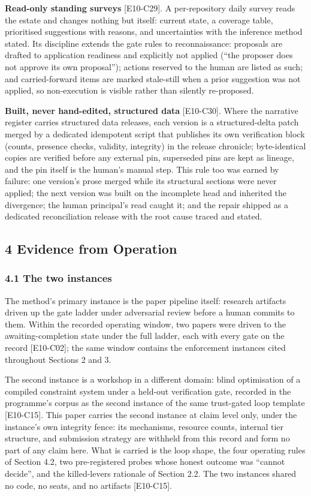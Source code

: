 \documentclass[
  11pt,
]{article}
\begin{document}
\textbf{Read-only standing surveys} {[}E10-C29{]}. A per-repository
daily survey reads the estate and changes nothing but itself: current
state, a coverage table, prioritised suggestions with reasons, and
uncertainties with the inference method stated. Its discipline extends
the gate rules to reconnaissance: proposals are drafted to application
readiness and explicitly not applied (``the proposer does not approve
its own proposal''); actions reserved to the human are listed as such;
and carried-forward items are marked stale-still when a prior suggestion
was not applied, so non-execution is visible rather than silently
re-proposed.

\textbf{Built, never hand-edited, structured data} {[}E10-C30{]}. Where
the narrative register carries structured data releases, each version is
a structured-delta patch merged by a dedicated idempotent script that
publishes its own verification block (counts, presence checks, validity,
integrity) in the release chronicle; byte-identical copies are verified
before any external pin, superseded pins are kept as lineage, and the
pin itself is the human's manual step. This rule too was earned by
failure: one version's prose merged while its structural sections were
never applied; the next version was built on the incomplete head and
inherited the divergence; the human principal's read caught it; and the
repair shipped as a dedicated reconciliation release with the root cause
traced and stated.

\subsection{4 Evidence from Operation}\label{evidence-from-operation}

\subsubsection{4.1 The two instances}\label{the-two-instances}

The method's primary instance is the paper pipeline itself: research
artifacts driven up the gate ladder under adversarial review before a
human commits to them. Within the recorded operating window, two papers
were driven to the awaiting-completion state under the full ladder, each
with every gate on the record {[}E10-C02{]}; the same window contains
the enforcement instances cited throughout Sections 2 and 3.

The second instance is a workshop in a different domain: blind
optimisation of a compiled constraint system under a held-out
verification gate, recorded in the programme's corpus as the second
instance of the same trust-gated loop template {[}E10-C15{]}. This paper
carries the second instance at claim level only, under the instance's
own integrity fence: its mechanisms, resource counts, internal tier
structure, and submission strategy are withheld from this record and
form no part of any claim here. What is carried is the loop shape, the
four operating rules of Section 4.2, two pre-registered probes whose
honest outcome was ``cannot decide'', and the killed-levers rationale of
Section 2.2. The two instances shared no code, no seats, and no
artifacts {[}E10-C15{]}.
\end{document}
